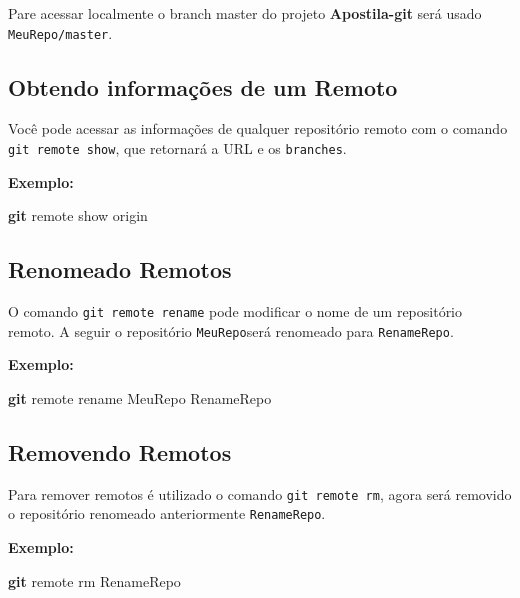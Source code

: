 \documentclass[
  a5paper,
  pagesize,
  9pt,
  pointlessnumbers,
  normalheadings,
  twoside=false
]{book}
\newenvironment{Shaded}{\begin{snugshade}}{\end{snugshade}}
\newcommand{\KeywordTok}[1]{\textcolor[rgb]{0.13,0.29,0.53}{\textbf{{#1}}}}
\newcommand{\NormalTok}[1]{{#1}}
\begin{document}
Pare acessar localmente o branch master do projeto \textbf{Apostila-git}
será usado \texttt{MeuRepo/master}.

\subsection{Obtendo informações de um
Remoto}\label{obtendo-informacoes-de-um-remoto}

Você pode acessar as informações de qualquer repositório remoto com o
comando \texttt{git remote show}, que retornará a URL e os
\texttt{branches}.

\textbf{Exemplo:}

\begin{Shaded}
\begin{Highlighting}[]
\KeywordTok{git} \NormalTok{remote show origin}
\end{Highlighting}
\end{Shaded}

\subsection{Renomeado Remotos}\label{renomeado-remotos}

O comando \texttt{git remote rename} pode modificar o nome de um
repositório remoto. A seguir o repositório \texttt{MeuRepo}será
renomeado para \texttt{RenameRepo}.

\textbf{Exemplo:}

\begin{Shaded}
\begin{Highlighting}[]
\KeywordTok{git} \NormalTok{remote rename MeuRepo RenameRepo}
\end{Highlighting}
\end{Shaded}

\subsection{Removendo Remotos}\label{removendo-remotos}

Para remover remotos é utilizado o comando \texttt{git remote rm}, agora
será removido o repositório renomeado anteriormente \texttt{RenameRepo}.

\textbf{Exemplo:}

\begin{Shaded}
\begin{Highlighting}[]
 \KeywordTok{git} \NormalTok{remote rm RenameRepo}
\end{Highlighting}
\end{Shaded}
\end{document}
